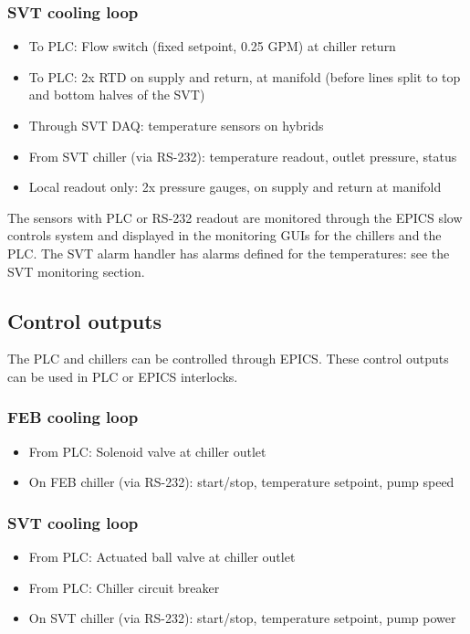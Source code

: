 \documentclass[12pt]{report}
\begin{document}
\subsubsection*{SVT cooling loop}
\begin{itemize}
    \item To PLC: Flow switch (fixed setpoint, 0.25 GPM) at chiller return
    \item To PLC: 2x RTD on supply and return, at manifold (before lines split to top and bottom halves of the SVT)
    \item Through SVT DAQ: temperature sensors on hybrids
    \item From SVT chiller (via RS-232): temperature readout, outlet pressure, status
    \item Local readout only: 2x pressure gauges, on supply and return at manifold
\end{itemize}

The sensors with PLC or RS-232 readout are monitored through the EPICS slow controls system and displayed in the monitoring GUIs for the chillers and the PLC.
The SVT alarm handler has alarms defined for the temperatures: see the SVT monitoring section.

\subsection{Control outputs}
The PLC and chillers can be controlled through EPICS. These control outputs can be used in PLC or EPICS interlocks.
\subsubsection*{FEB cooling loop}
\begin{itemize}
    \item From PLC: Solenoid valve at chiller outlet
    \item On FEB chiller (via RS-232): start/stop, temperature setpoint, pump speed
\end{itemize}
\subsubsection*{SVT cooling loop}
\begin{itemize}
    \item From PLC: Actuated ball valve at chiller outlet
    \item From PLC: Chiller circuit breaker
    \item On SVT chiller (via RS-232): start/stop, temperature setpoint, pump power
\end{itemize}
\end{document}
